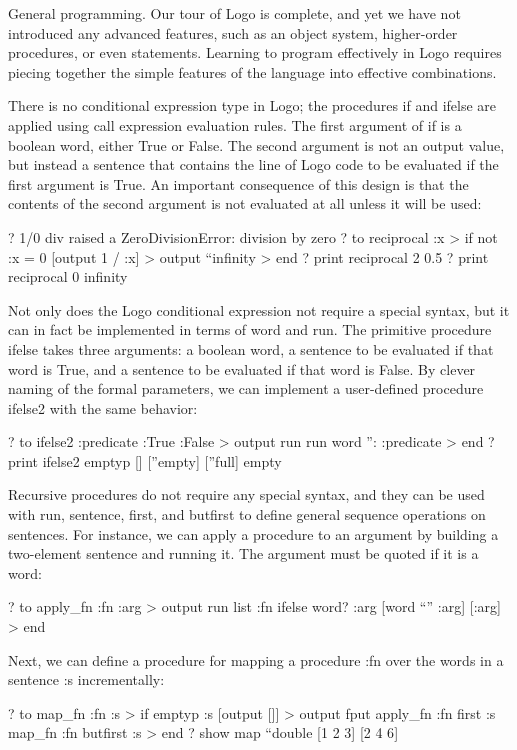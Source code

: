 \documentclass[letterpaper,10pt,dvipdfmx]{sphinxmanual}
\begin{document}
General programming. Our tour of Logo is complete, and yet we have not introduced any advanced features, such as an object system, higher-order procedures, or even statements. Learning to program effectively in Logo requires piecing together the simple features of the language into effective combinations.

There is no conditional expression type in Logo; the procedures if and ifelse are applied using call expression evaluation rules. The first argument of if is a boolean word, either True or False. The second argument is not an output value, but instead a sentence that contains the line of Logo code to be evaluated if the first argument is True. An important consequence of this design is that the contents of the second argument is not evaluated at all unless it will be used:

? 1/0
div raised a ZeroDivisionError: division by zero
? to reciprocal :x
\textgreater{} if not :x = 0 {[}output 1 / :x{]}
\textgreater{} output ``infinity
\textgreater{} end
? print reciprocal 2
0.5
? print reciprocal 0
infinity

Not only does the Logo conditional expression not require a special syntax, but it can in fact be implemented in terms of word and run. The primitive procedure ifelse takes three arguments: a boolean word, a sentence to be evaluated if that word is True, and a sentence to be evaluated if that word is False. By clever naming of the formal parameters, we can implement a user-defined procedure ifelse2 with the same behavior:

? to ifelse2 :predicate :True :False
\textgreater{} output run run word '': :predicate
\textgreater{} end
? print ifelse2 emptyp {[}{]} {[}''empty{]} {[}''full{]}
empty

Recursive procedures do not require any special syntax, and they can be used with run, sentence, first, and butfirst to define general sequence operations on sentences. For instance, we can apply a procedure to an argument by building a two-element sentence and running it. The argument must be quoted if it is a word:

? to apply\_fn :fn :arg
\textgreater{} output run list :fn ifelse word? :arg {[}word ``'' :arg{]} {[}:arg{]}
\textgreater{} end

Next, we can define a procedure for mapping a procedure :fn over the words in a sentence :s incrementally:

? to map\_fn :fn :s
\textgreater{} if emptyp :s {[}output {[}{]}{]}
\textgreater{} output fput apply\_fn :fn first :s map\_fn :fn butfirst :s
\textgreater{} end
? show map ``double {[}1 2 3{]}
{[}2 4 6{]}
\end{document}
